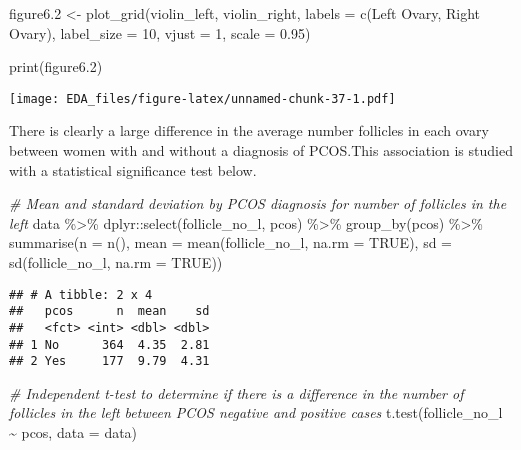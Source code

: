 \documentclass[
]{article}
\newenvironment{Shaded}{\begin{snugshade}}{\end{snugshade}}
\newcommand{\AttributeTok}[1]{\textcolor[rgb]{0.77,0.63,0.00}{#1}}
\newcommand{\CommentTok}[1]{\textcolor[rgb]{0.56,0.35,0.01}{\textit{#1}}}
\newcommand{\ConstantTok}[1]{\textcolor[rgb]{0.00,0.00,0.00}{#1}}
\newcommand{\DecValTok}[1]{\textcolor[rgb]{0.00,0.00,0.81}{#1}}
\newcommand{\FloatTok}[1]{\textcolor[rgb]{0.00,0.00,0.81}{#1}}
\newcommand{\FunctionTok}[1]{\textcolor[rgb]{0.00,0.00,0.00}{#1}}
\newcommand{\NormalTok}[1]{#1}
\newcommand{\OtherTok}[1]{\textcolor[rgb]{0.56,0.35,0.01}{#1}}
\newcommand{\SpecialCharTok}[1]{\textcolor[rgb]{0.00,0.00,0.00}{#1}}
\newcommand{\StringTok}[1]{\textcolor[rgb]{0.31,0.60,0.02}{#1}}
\begin{document}
\begin{Shaded}
\begin{Highlighting}[]
\NormalTok{figure6}\FloatTok{.2} \OtherTok{\textless{}{-}} \FunctionTok{plot\_grid}\NormalTok{(violin\_left, violin\_right, }\AttributeTok{labels =} \FunctionTok{c}\NormalTok{(}\StringTok{\textquotesingle{}Left Ovary\textquotesingle{}}\NormalTok{, }\StringTok{\textquotesingle{}Right Ovary\textquotesingle{}}\NormalTok{), }\AttributeTok{label\_size =} \DecValTok{10}\NormalTok{, }\AttributeTok{vjust =} \DecValTok{1}\NormalTok{, }\AttributeTok{scale =} \FloatTok{0.95}\NormalTok{)}

\FunctionTok{print}\NormalTok{(figure6}\FloatTok{.2}\NormalTok{)}
\end{Highlighting}
\end{Shaded}

\texttt{[image: EDA\_files/figure-latex/unnamed-chunk-37-1.pdf]}

There is clearly a large difference in the average number follicles in
each ovary between women with and without a diagnosis of PCOS.This
association is studied with a statistical significance test below.

\begin{Shaded}
\begin{Highlighting}[]
\CommentTok{\# Mean and standard deviation by PCOS diagnosis for number of follicles in the left}
\NormalTok{data }\SpecialCharTok{\%\textgreater{}\%}\NormalTok{ dplyr}\SpecialCharTok{::}\FunctionTok{select}\NormalTok{(follicle\_no\_l, pcos) }\SpecialCharTok{\%\textgreater{}\%} \FunctionTok{group\_by}\NormalTok{(pcos) }\SpecialCharTok{\%\textgreater{}\%} 
  \FunctionTok{summarise}\NormalTok{(}\AttributeTok{n =} \FunctionTok{n}\NormalTok{(), }
            \AttributeTok{mean =} \FunctionTok{mean}\NormalTok{(follicle\_no\_l, }\AttributeTok{na.rm =} \ConstantTok{TRUE}\NormalTok{), }
            \AttributeTok{sd =} \FunctionTok{sd}\NormalTok{(follicle\_no\_l, }\AttributeTok{na.rm =} \ConstantTok{TRUE}\NormalTok{))}
\end{Highlighting}
\end{Shaded}

\begin{verbatim}
## # A tibble: 2 x 4
##   pcos      n  mean    sd
##   <fct> <int> <dbl> <dbl>
## 1 No      364  4.35  2.81
## 2 Yes     177  9.79  4.31
\end{verbatim}

\begin{Shaded}
\begin{Highlighting}[]
\CommentTok{\# Independent t{-}test to determine if there is a difference in the number of follicles in the left between PCOS negative and positive cases}
\FunctionTok{t.test}\NormalTok{(follicle\_no\_l }\SpecialCharTok{\textasciitilde{}}\NormalTok{ pcos, }\AttributeTok{data =}\NormalTok{ data)}
\end{Highlighting}
\end{Shaded}
\end{document}
